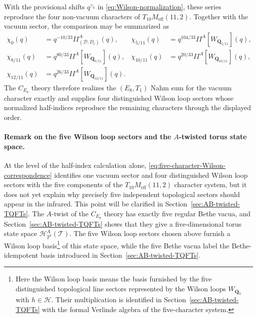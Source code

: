 \documentclass[11pt,a4paper]{article}
\numberwithin{equation}{section}
\begin{document}
With the provisional shifts $q^{\gamma_h}$ in \eqref{eq:Wilson-normalization}, these series reproduce the four non-vacuum characters of $T_{10}M_{\mathrm{eff}}(11,2)$.  Together with the vacuum sector, the comparison may be summarized as
\begin{align}
  \chi_0(q)
  &=q^{-10/33}I\!\!I_{(\mathcal D,D_c)}^{A}(q),
  &
  \chi_{5/11}(q)
  &=q^{104/33}I\!\!I^{A}[W_{\boldsymbol Q_{5/11}}](q),\nonumber\\
  \chi_{8/11}(q)
  &=q^{80/33}I\!\!I^{A}[W_{\boldsymbol Q_{8/11}}](q),
  &
  \chi_{10/11}(q)
  &=q^{20/33}I\!\!I^{A}[W_{\boldsymbol Q_{10/11}}](q),\nonumber\\
  \chi_{12/11}(q)
  &=q^{26/33}I\!\!I^{A}[W_{\boldsymbol Q_{12/11}}](q).
  \label{eq:five-character-Wilson-correspondence}
\end{align}
The $C_{E_8}$ theory therefore realizes the $(E_8,T_1)$ Nahm sum for the vacuum character exactly and supplies four distinguished Wilson loop sectors whose normalized half-indices reproduce the remaining characters through the displayed order.

\paragraph{Remark on the five Wilson loop sectors and the $A$-twisted torus state space.}
At the level of the half-index calculation alone, \eqref{eq:five-character-Wilson-correspondence} identifies one vacuum sector and four distinguished Wilson loop sectors with the five components of the $T_{10}M_{\mathrm{eff}}(11,2)$ character system, but it does not yet explain why precisely five independent topological sectors should appear in the infrared.  This point will be clarified in Section~\ref{sec:AB-twisted-TQFTs}.  The $A$-twist of the $C_{E_8}$ theory has exactly five regular Bethe vacua, and Section~\ref{sec:AB-twisted-TQFTs} shows that they give a five-dimensional torus state space $\mathscr H_{T^2}^{A}(\mathcal T)$.  The five Wilson loop sectors chosen above furnish a Wilson loop basis\footnote{Here the Wilson loop basis means the basis furnished by the five distinguished topological line sectors represented by the Wilson loops $W_{\boldsymbol Q_h}$ with $h\in\mathcal H$.  Their multiplication is identified in Section~\ref{sec:AB-twisted-TQFTs} with the formal Verlinde algebra of the five-character system.} of this state space, while the five Bethe vacua label the Bethe-idempotent basis introduced in Section~\ref{sec:AB-twisted-TQFTs}.
\end{document}
